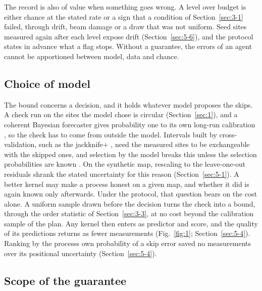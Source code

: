 \documentclass{iopjournal}
\begin{document}
The record is also of value when something goes wrong. A level over budget is either chance at the stated rate or a sign that a condition of Section~\ref{sec:3-1} failed, through drift, beam damage or a draw that was not uniform. Seed sites measured again after each level expose drift (Section~\ref{sec:5-6}), and the protocol states in advance what a flag stops. Without a guarantee, the errors of an agent cannot be apportioned between model, data and chance.

\hypertarget{choice-of-model}{%
\subsection{Choice of model}\label{choice-of-model}}

The bound concerns a decision, and it holds whatever model proposes the skips. A check run on the sites the model chose is circular (Section~\ref{sec:1}), and a coherent Bayesian forecaster gives probability one to its own long-run calibration \cite{Dawid1982}, so the check has to come from outside the model. Intervals built by cross-validation, such as the jackknife+ \cite{Barber2021}, need the measured sites to be exchangeable with the skipped ones, and selection by the model breaks this unless the selection probabilities are known \cite{Fannjiang2022,ZrnicCandes2024}. On the synthetic map, rescaling to the leave-one-out residuals shrank the stated uncertainty for this reason (Section~\ref{sec:5-1}). A better kernel may make a process honest on a given map, and whether it did is again known only afterwards. Under the protocol, that question bears on the cost alone. A uniform sample drawn before the decision turns the check into a bound, through the order statistic of Section~\ref{sec:3-3}, at no cost beyond the calibration sample of the plan. Any kernel then enters as predictor and score, and the quality of its predictions returns as fewer measurements (Fig.~\ref{fig:1}; Section~\ref{sec:5-4}). Ranking by the process\textquotesingle s own probability of a skip error saved no measurements over its positional uncertainty (Section~\ref{sec:5-4}).

\hypertarget{scope-of-the-guarantee}{%
\subsection{Scope of the guarantee}\label{scope-of-the-guarantee}}
\end{document}
